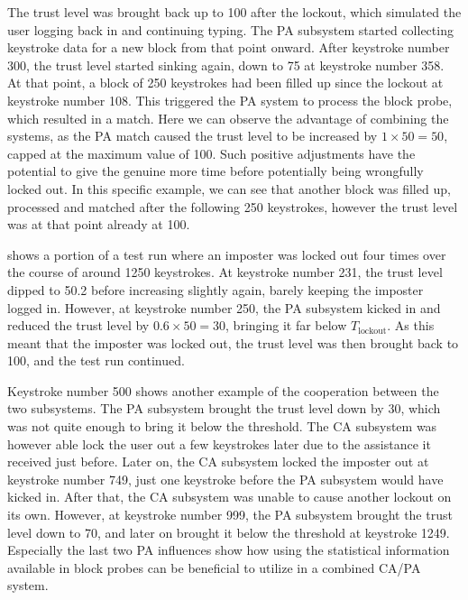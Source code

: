 The trust level was brought back up to 100 after the lockout, which simulated the user logging back in and continuing typing.
The PA subsystem started collecting keystroke data for a new block from that point onward.
After keystroke number 300, the trust level started sinking again, down to 75 at keystroke number 358.
At that point, a block of 250 keystrokes had been filled up since the lockout at keystroke number 108.
This triggered the PA system to process the block probe, which resulted in a match.
Here we can observe the advantage of combining the systems, as the PA match caused the trust level to be increased by $1 \times 50 = 50$, capped at the maximum value of 100.
Such positive adjustments have the potential to give the genuine more time before potentially being wrongfully locked out.
In this specific example, we can see that another block was filled up, processed and matched after the following 250 keystrokes, however the trust level was at that point already at 100.

 shows a portion of a test run where an imposter was locked out four times over the course of around 1250 keystrokes.
At keystroke number 231, the trust level dipped to 50.2 before increasing slightly again, barely keeping the imposter logged in.
However, at keystroke number 250, the PA subsystem kicked in and reduced the trust level by $0.6 \times 50 = 30$, bringing it far below $T_{\text{lockout}}$.
As this meant that the imposter was locked out, the trust level was then brought back to 100, and the test run continued.

Keystroke number 500 shows another example of the cooperation between the two subsystems.
The PA subsystem brought the trust level down by 30, which was not quite enough to bring it below the threshold.
The CA subsystem was however able lock the user out a few keystrokes later due to the assistance it received just before.
Later on, the CA subsystem locked the imposter out at keystroke number 749, just one keystroke before the PA subsystem would have kicked in.
After that, the CA subsystem was unable to cause another lockout on its own.
However, at keystroke number 999, the PA subsystem brought the trust level down to 70, and later on brought it below the threshold at keystroke 1249.
Especially the last two PA influences show how using the statistical information available in block probes can be beneficial to utilize in a combined CA/PA system.



